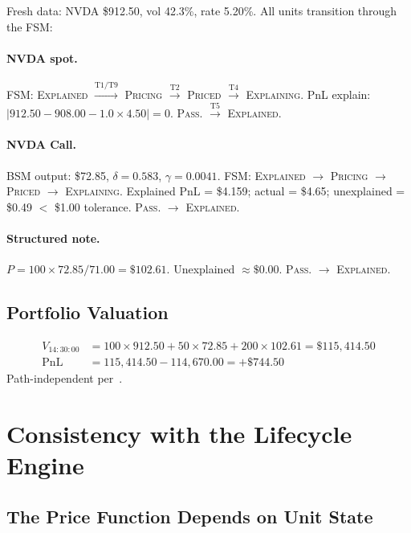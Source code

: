 \documentclass[11pt,a4paper]{article}
\begin{document}
Fresh data: NVDA \$912.50, vol 42.3\%, rate 5.20\%.  All units transition through the FSM:

\paragraph{NVDA spot.}  FSM: \textsc{Explained} $\xrightarrow{\text{T1/T9}}$ \textsc{Pricing} $\xrightarrow{\text{T2}}$ \textsc{Priced} $\xrightarrow{\text{T4}}$ \textsc{Explaining}.  PnL explain: $|912.50 - 908.00 - 1.0 \times 4.50| = 0$.  \textsc{Pass}.  $\xrightarrow{\text{T5}}$ \textsc{Explained}.

\paragraph{NVDA Call.}  BSM output: \$72.85, $\delta = 0.583$, $\gamma = 0.0041$.  FSM: \textsc{Explained} $\to$ \textsc{Pricing} $\to$ \textsc{Priced} $\to$ \textsc{Explaining}.  Explained PnL = \$4.159; actual = \$4.65; unexplained = \$0.49 $<$ \$1.00 tolerance.  \textsc{Pass}.  $\to$ \textsc{Explained}.

\paragraph{Structured note.}  $P = 100 \times 72.85 / 71.00 = \$102.61$.  Unexplained $\approx \$0.00$.  \textsc{Pass}.  $\to$ \textsc{Explained}.

\subsection{Portfolio Valuation}

\begin{align*}
V_{14:30:00} &= 100 \times 912.50 + 50 \times 72.85 + 200 \times 102.61 = \$115{,}414.50 \\
\mathrm{PnL} &= 115{,}414.50 - 114{,}670.00 = +\$744.50
\end{align*}
Path-independent per~\cite[\S4.3]{ledger}.

\clearpage
\section{Consistency with the Lifecycle Engine}
\label{sec:lifecycle-consistency}

\subsection{The Price Function Depends on Unit State}
\end{document}
